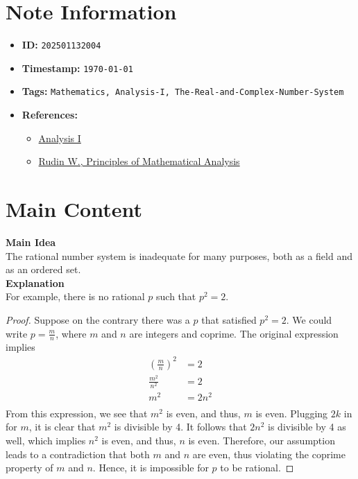 \clearpage
{}
\label{202501132004}
\renewcommand{\notetitle}{Rationals are Inadequate}

\section*{Note Information}
\begin{itemize}
  \item \textbf{ID:} \texttt{202501132004}
  \item \textbf{Timestamp:} \texttt{\today \ \currenttime}
  \item \textbf{Tags:} \texttt{Mathematics, Analysis-I, The-Real-and-Complex-Number-System}
  \item \textbf{References:}
    \begin{itemize}
      \item \href{https://ocw.mit.edu/courses/18-100b-analysis-i-fall-2010/}{Analysis I}
      \item \href{/home/garrett/Personal/References/Mathematics/Analysis-I/Rudin.pdf}{Rudin W., Principles of Mathematical Analysis}
    \end{itemize}
\end{itemize}


\section*{Main Content}
\textbf{Main Idea}\\
The rational number system is inadequate for many purposes, both as a field and as an ordered set.\\

\textbf{Explanation}\\
For example, there is no rational $p$ such that $p^2 = 2$.\\

\begin{proof}
  Suppose on the contrary there was a $p$ that satisfied $p^2 = 2$. We could write $p = \frac{m}{n}$, where $m$ and $n$ are integers and coprime. The original expression implies
  \begin{align*}
    (\frac{m}{n})^2 &= 2\\
    \frac{m^2}{n^2} &= 2\\
    m^2 &= 2n^2\\
  \end{align*}
  From this expression, we see that $m^2$ is even, and thus, $m$ is even. Plugging $2k$ in for $m$, it is clear that $m^2$ is divisible by 4. It follows that $2n^2$ is divisible by 4 as well, which implies $n^2$ is even, and thus, $n$ is even. Therefore, our assumption leads to a contradiction that both $m$ and $n$ are even, thus violating the coprime property of $m$ and $n$. Hence, it is impossible for $p$ to be rational. 
\end{proof}

